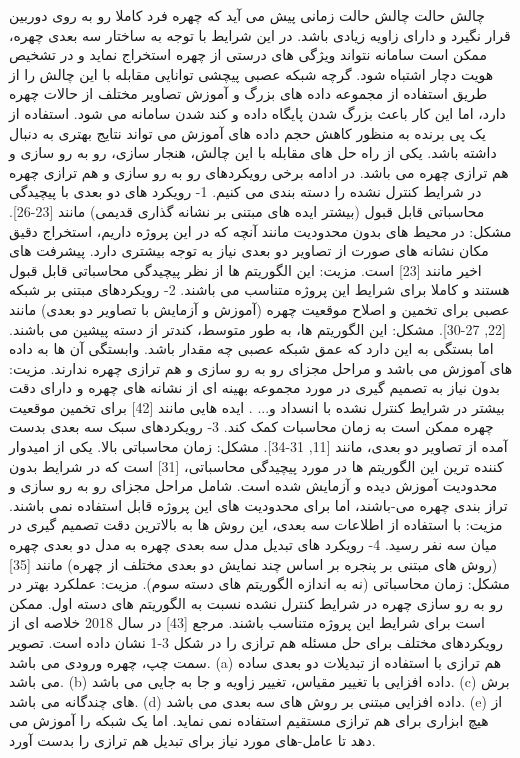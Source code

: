 	چالش حالت 
چالش حالت زمانی پیش می آید که چهره فرد کاملا رو به روی دوربین قرار نگیرد و دارای زاویه زیادی باشد. در این شرایط با توجه به ساختار سه بعدی چهره، ممکن است سامانه نتواند ویژگی های درستی از چهره استخراج نماید و در تشخیص هویت دچار اشتباه شود. گرچه شبکه عصبی پیچشی توانایی مقابله با این چالش را از طریق استفاده از مجموعه داده های بزرگ و آموزش تصاویر مختلف از حالات چهره دارد، اما این کار باعث بزرگ شدن پایگاه داده و کند شدن سامانه می شود. استفاده از یک پی برنده  به منظور کاهش حجم داده های آموزش می تواند نتایج بهتری به دنبال داشته باشد. یکی از راه  حل های مقابله با این چالش، هنجار سازی، رو به رو سازی  و هم ترازی  چهره می باشد. در ادامه برخی رویکردهای رو به رو سازی و هم ترازی چهره در شرایط کنترل نشده را دسته بندی می کنیم.
1- رویکرد های دو بعدی با پیچیدگی محاسباتی قابل قبول (بیشتر ایده های مبتنی بر نشانه گذاری  قدیمی) مانند [23-26].
مشکل: در محیط های بدون محدودیت مانند آنچه که در این پروژه داریم، استخراج دقیق مکان نشانه های صورت از تصاویر دو بعدی نیاز به توجه بیشتری دارد. پیشرفت های اخیر مانند [23] است.
مزیت: این الگوریتم ها از نظر پیچیدگی محاسباتی  قابل قبول هستند و کاملا برای شرایط این پروژه متناسب می باشند.
2- رویکردهای مبتنی بر شبکه عصبی برای تخمین و اصلاح موقعیت چهره (آموزش و آزمایش با تصاویر دو بعدی) مانند [22, 27-30].
مشکل: این الگوریتم ها، به طور متوسط، کندتر از دسته پیشین می باشند. اما بستگی به این دارد که عمق شبکه عصبی چه مقدار باشد. وابستگی آن ها به داده های آموزش می باشد و مراحل مجزای رو به رو سازی و هم ترازی چهره ندارند.
مزیت: بدون نیاز به تصمیم گیری در مورد مجموعه بهینه ای از نشانه های چهره و دارای دقت بیشتر در شرایط کنترل نشده با انسداد و... . ایده هایی مانند [42] برای تخمین موقعیت چهره ممکن است به زمان محاسبات کمک کند.
3- رویکردهای سبک سه بعدی بدست آمده از تصاویر دو بعدی، مانند [11, 31-34].
مشکل: زمان محاسباتی بالا. یکی از امیدوار کننده ترین این الگوریتم ها در مورد پیچیدگی محاسباتی، [31] است که در شرایط بدون محدودیت آموزش دیده و آزمایش شده است. شامل مراحل مجزای رو به رو سازی و تراز بندی چهره می-باشند، اما برای محدودیت های این پروژه قابل استفاده نمی باشند.
مزیت: با استفاده از اطلاعات سه بعدی، این روش ها به بالاترین دقت تصمیم گیری در میان سه نفر رسید.
4- رویکرد های تبدیل مدل سه بعدی چهره به مدل دو بعدی چهره (روش های مبتنی بر پنجره  بر اساس چند نمایش دو بعدی مختلف از چهره) مانند [35]
مشکل: زمان محاسباتی (نه به اندازه الگوریتم های دسته سوم). 
مزیت: عملکرد بهتر در رو به رو سازی چهره در شرایط کنترل نشده نسبت به الگوریتم های دسته اول. ممکن است برای شرایط این پروژه متناسب باشند.
مرجع [43] در سال 2018 خلاصه ای از رویکردهای مختلف برای حل مسئله هم ترازی را در شکل 3-1 نشان داده است. تصویر سمت چپ، چهره ورودی می باشد. (a) هم ترازی با استفاده از تبدیلات دو بعدی ساده می باشد. (b) داده افزایی  با تغییر مقیاس، تغییر زاویه و جا به جایی می باشد. (c) برش های چندگانه می باشد. (d) داده افزایی مبتنی بر روش های سه بعدی می باشد. (e) از هیچ ابزاری برای هم ترازی مستقیم استفاده نمی نماید. اما یک شبکه را آموزش می دهد تا عامل-های مورد نیاز برای تبدیل هم ترازی را بدست آورد.
 
